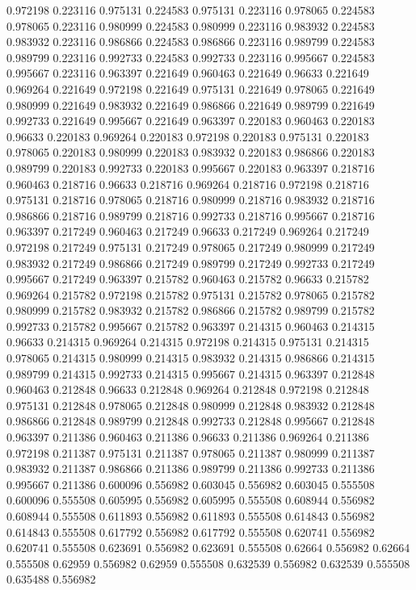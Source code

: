 0.972198 0.223116
0.975131 0.224583
0.975131 0.223116
0.978065 0.224583
0.978065 0.223116
0.980999 0.224583
0.980999 0.223116
0.983932 0.224583
0.983932 0.223116
0.986866 0.224583
0.986866 0.223116
0.989799 0.224583
0.989799 0.223116
0.992733 0.224583
0.992733 0.223116
0.995667 0.224583
0.995667 0.223116
0.963397 0.221649
0.960463 0.221649
0.96633 0.221649
0.969264 0.221649
0.972198 0.221649
0.975131 0.221649
0.978065 0.221649
0.980999 0.221649
0.983932 0.221649
0.986866 0.221649
0.989799 0.221649
0.992733 0.221649
0.995667 0.221649
0.963397 0.220183
0.960463 0.220183
0.96633 0.220183
0.969264 0.220183
0.972198 0.220183
0.975131 0.220183
0.978065 0.220183
0.980999 0.220183
0.983932 0.220183
0.986866 0.220183
0.989799 0.220183
0.992733 0.220183
0.995667 0.220183
0.963397 0.218716
0.960463 0.218716
0.96633 0.218716
0.969264 0.218716
0.972198 0.218716
0.975131 0.218716
0.978065 0.218716
0.980999 0.218716
0.983932 0.218716
0.986866 0.218716
0.989799 0.218716
0.992733 0.218716
0.995667 0.218716
0.963397 0.217249
0.960463 0.217249
0.96633 0.217249
0.969264 0.217249
0.972198 0.217249
0.975131 0.217249
0.978065 0.217249
0.980999 0.217249
0.983932 0.217249
0.986866 0.217249
0.989799 0.217249
0.992733 0.217249
0.995667 0.217249
0.963397 0.215782
0.960463 0.215782
0.96633 0.215782
0.969264 0.215782
0.972198 0.215782
0.975131 0.215782
0.978065 0.215782
0.980999 0.215782
0.983932 0.215782
0.986866 0.215782
0.989799 0.215782
0.992733 0.215782
0.995667 0.215782
0.963397 0.214315
0.960463 0.214315
0.96633 0.214315
0.969264 0.214315
0.972198 0.214315
0.975131 0.214315
0.978065 0.214315
0.980999 0.214315
0.983932 0.214315
0.986866 0.214315
0.989799 0.214315
0.992733 0.214315
0.995667 0.214315
0.963397 0.212848
0.960463 0.212848
0.96633 0.212848
0.969264 0.212848
0.972198 0.212848
0.975131 0.212848
0.978065 0.212848
0.980999 0.212848
0.983932 0.212848
0.986866 0.212848
0.989799 0.212848
0.992733 0.212848
0.995667 0.212848
0.963397 0.211386
0.960463 0.211386
0.96633 0.211386
0.969264 0.211386
0.972198 0.211387
0.975131 0.211387
0.978065 0.211387
0.980999 0.211387
0.983932 0.211387
0.986866 0.211386
0.989799 0.211386
0.992733 0.211386
0.995667 0.211386
0.600096 0.556982
0.603045 0.556982
0.603045 0.555508
0.600096 0.555508
0.605995 0.556982
0.605995 0.555508
0.608944 0.556982
0.608944 0.555508
0.611893 0.556982
0.611893 0.555508
0.614843 0.556982
0.614843 0.555508
0.617792 0.556982
0.617792 0.555508
0.620741 0.556982
0.620741 0.555508
0.623691 0.556982
0.623691 0.555508
0.62664 0.556982
0.62664 0.555508
0.62959 0.556982
0.62959 0.555508
0.632539 0.556982
0.632539 0.555508
0.635488 0.556982
